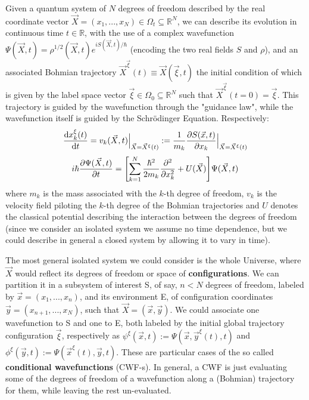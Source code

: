 \documentclass[11pt, a4paper]{article} %
\newcommand{\R}{\mathbb{R}} %
\begin{document}
Given a quantum system of $N$ degrees of freedom described by the real coordinate vector $\vec{X}=(x_1,...,x_N)\in\Omega_t\subseteq\R^N$, we can describe its evolution in continuous time $t\in\R$, with the use of a complex wavefunction $\Psi(\vec{X},t)=\rho^{1/2}(\vec{X},t)e^{iS(\vec{X},t)/\hbar}$ (encoding the two real fields $S$ and $\rho$), and an associated Bohmian trajectory $\vec{X}^{\vec{\xi}}(t)\equiv \vec{X}(\vec{\xi},t)$ the initial condition of which is given by the label space vector $\vec{\xi}\in\Omega_0\subseteq\R^N$ such that $\vec{X}^{\vec{\xi}}(t=0)=\vec{\xi}$. This trajectory is guided by the wavefunction through the "guidance law", while the wavefunction itself is guided by the Schrödinger Equation. Respectively:
\begin{equation}\label{GL}
\dv{x_k^\xi(t)}{t} = v_k(\vec{X},t)\Big\rvert_{\vec{X}=\vec{X}^\xi(t)}:=\frac{1}{m_k} \pdv{S(\vec{x},t)}{x_k}\Big\rvert_{\vec{X}=\vec{X}^\xi(t)}
\end{equation}
\begin{equation}\label{SE}
i\hbar\pdv{\Psi(\vec{X},t)}{t}=\qty[ \sum_{k=1}^N \frac{\hbar^2}{2m_k}\pdv[2]{}{x_k}+U(\vec{X})]\Psi(\vec{X},t)
\end{equation}
where $m_k$ is the mass associated with the $k$-th degree of freedom, $v_k$ is the velocity field piloting the $k$-th degree of the Bohmian trajectories and $U$ denotes the classical potential describing the interaction between the degrees of freedom (since we consider an isolated system we assume no time dependence, but we could describe in general a closed system by allowing it to vary in time).

The most general isolated system we could consider is the whole Universe, where $\vec{X}$ would reflect its degrees of freedom or space of {\bf configurations}. We can partition it in a subsystem of interest S, of say, $n<N$ degrees of freedom, labeled by $\vec{x}=(x_1,...,x_n)$, and its environment E, of configuration coordinates $\vec{y}=(x_{n+1},...,x_N)$, such that $\vec{X}=(\vec{x},\vec{y})$. We could associate one wavefunction to S and one to E, both labeled by the initial global trajectory configuration $\vec{\xi}$, respectively as $\psi^\xi(\vec{x},t):=\Psi(\vec{x},\vec{y}^\xi(t),t)$ and $\phi^\xi(\vec{y},t):=\Psi(\vec{x}^\xi(t),\vec{y},t)$. These are particular cases of the so called {\bf conditional wavefunctions} (CWF-s). In general, a CWF is just evaluating some of the degrees of freedom of a wavefunction along a (Bohmian) trajectory for them, while leaving the rest un-evaluated.
\end{document}
